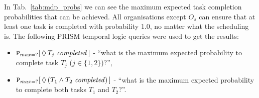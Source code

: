 \documentclass{llncs}
\begin{document}
\vspace{-25pt}
\begin{table}
\centering
{}
\caption{Maximum task completion probabilities for optimal agent organisations using Alg.~\ref{alg:join_team_nondet}'s online and offline versions (see Alg.~\ref{alg:main_process}).}
\label{tab:mdp_probs}
\end{table}
\vspace{-25pt}
In Tab.~\ref{tab:mdp_probs} we can see the maximum expected task completion probabilities that can be achieved. All organisations except $O_s$ can ensure that at least one task is completed with probability $1.0$, no matter what the scheduling is. The following PRISM temporal logic queries were used to get the results:
\begin{itemize}
 \item ${\tt P}_{max=?}[\,\Diamond\,T_{j} \mathit{\ completed}\,]$ -
``what is the maximum expected probability to complete  task $T_j$ ($j\in\{1,2\}$)?'',
 \item ${\tt P}_{max=?}[\,\Diamond\,(T_{1} \wedge T_2 \mathit{\ completed})\,]$ -
``what is the maximum expected probability to complete  both tasks $T_1$ and $T_2$?''.
\end{itemize}
\end{document}
